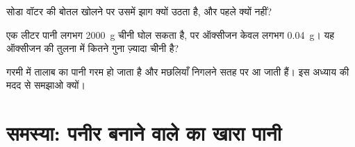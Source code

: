 \begin{exercise}[$\star\star$]\label{exo:g6:solutions-and-solubility:10}
सोडा वॉटर की बोतल खोलने पर उसमें झाग क्यों उठता है, और पहले
क्यों नहीं?
\end{exercise}

\begin{exercise}[$\star\star\star$]\label{exo:g6:solutions-and-solubility:11}
एक लीटर पानी लगभग \qty{2000}{g} चीनी घोल सकता है, पर ऑक्सीजन केवल
लगभग \qty{0.04}{g}। यह ऑक्सीजन की तुलना में कितने गुना ज़्यादा
चीनी है?
\end{exercise}

\begin{exercise}[$\star\star\star$]\label{exo:g6:solutions-and-solubility:12}
गरमी में तालाब का पानी गरम हो जाता है और मछलियाँ  निगलने सतह पर
आ जाती हैं। इस अध्याय की मदद से समझाओ क्यों।
\end{exercise}

\section{समस्या: पनीर बनाने वाले का खारा पानी}

